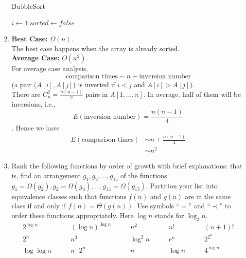 \documentclass[12pt,a4paper]{article}
\makeatletter
\newtheorem*{solution}{Solution}
\theoremstyle{definition}
\renewenvironment{solution}[1][Solution] {\par\pushQED{\qed}\normalfont\topsep6\p@\@plus6\p@\relax\trivlist\item[\hskip\labelsep\bfseries#1\@addpunct{.}]\ignorespaces}{\popQED\endtrivlist\@endpefalse} \makeatother
\makeatother
\begin{document}
\begin{enumerate}
    \begin{minipage}[t]{0.8\textwidth}
    \begin{algorithm}[H]

        \BlankLine
        \caption{BubbleSort}\label{Alg_Bubble}

        $i\leftarrow 1$;$sorted\leftarrow false$\;

    \end{algorithm}
    \end{minipage}

    \begin{solution}
    	\hfill \break
    	
        \textbf{Best Case:} $\Omega(n)$. \\
        The best case happens when the array is already sorted. \\
        \textbf{Average Case:} $O(n^2)$. \\
        For average case analysis, \[\text{comparison times} \sim n + \text{inversion number}\](a pair ($A[i], A[j]$) is inverted if $i<j$ and $A[i] > A[j]$). \\
        There are $C_{n}^{2} = \frac{n(n - 1)}{2}$ pairs in $A[1,\dots,n]$. In average, half of them will be inversions, i.e., $$E(\text{inversion number}) = \frac{n(n - 1)}{4}$$. Hence we have
        \begin{align*}
        	E(\text{comparison times}) & \sim n + \frac{n(n - 1)}{4} \\
        	& \sim n^2
        \end{align*}
    \end{solution}

    \item

    Rank the following functions by order of growth with brief explanations: that is, find an arrangement $g_1, g_2, \ldots , g_{15}$ of the functions $g_1 = \Omega(g_2), g_2 = \Omega(g_3), \ldots, g_{14} = \Omega(g_{15})$.  Partition your list into equivalence classes such that functions $f(n)$ and $g(n)$ are in the same class if and only if $f(n) = \Theta(g(n))$. Use symbols ``$=$'' and ``$\prec$'' to order these functions appropriately. Here $\log n$ stands for $\log_2 n$.
    $$
    \begin{array}{ccccc}
        2^{\log n} \quad & \quad (\log n)^{\log n} \quad & \quad n^2 \quad & \quad n! \quad & \quad (n + 1)! \\
        2^n \quad & \quad n^3 \quad & \quad \log^2 n \quad & \quad e^n \quad & \quad 2^{2^n} \\
        \log\log n \quad & \quad n\cdot 2^n \quad & \quad n \quad & \quad \log n \quad & \quad 4^{\log n} \\
    \end{array}
    $$


\end{enumerate}
\end{document}
